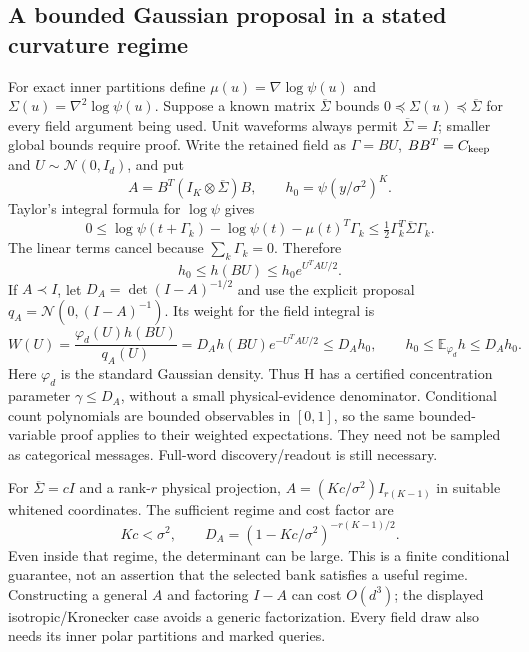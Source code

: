\documentclass[10pt,a4paper]{article}
\newcommand{\E}{\mathbb E}
\begin{document}
\subsection{A bounded Gaussian proposal in a stated curvature regime}
For exact inner partitions define $\mu(u)=\nabla\log\psi(u)$ and
$\Sigma(u)=\nabla^2\log\psi(u)$. Suppose a known matrix $\overline\Sigma$ bounds
$0\preceq\Sigma(u)\preceq\overline\Sigma$ for every field argument being used.
Unit waveforms always permit $\overline\Sigma=I$; smaller global bounds require proof.
Write the retained field as $\Gamma=B U$, $BB^T=C_{\rm keep}$ and $U\sim\mathcal N(0,I_d)$, and put
\[
 A=B^T(I_K\otimes\overline\Sigma)B,\qquad h_0=\psi(y/\sigma^2)^K.
\]
Taylor's integral formula for $\log\psi$ gives
\[
 0\leq\log\psi(t+\Gamma_k)-\log\psi(t)-\mu(t)^T\Gamma_k
       \leq\tfrac12\Gamma_k^T\overline\Sigma\Gamma_k.
\]
The linear terms cancel because $\sum_k\Gamma_k=0$. Therefore
\begin{equation}
 h_0\leq h(BU)\leq h_0e^{U^TAU/2}.
 \label{eq:field-quadratic-envelope}
\end{equation}
If $A\prec I$, let $D_A=\det(I-A)^{-1/2}$ and use the explicit proposal
$q_A=\mathcal N(0,(I-A)^{-1})$. Its weight for the field integral is
\begin{equation}
 W(U)=\frac{\varphi_d(U)h(BU)}{q_A(U)}
     =D_Ah(BU)e^{-U^TAU/2}\leq D_Ah_0,\qquad
 h_0\leq\E_{\varphi_d}h\leq D_Ah_0.
 \label{eq:field-bounded-proposal}
\end{equation}
Here $\varphi_d$ is the standard Gaussian density. Thus H has a certified concentration parameter
$\gamma\leq D_A$, without a small physical-evidence denominator. Conditional count polynomials are bounded
observables in $[0,1]$, so the same bounded-variable proof applies to their weighted expectations.
They need not be sampled as categorical messages. Full-word discovery/readout is still necessary.

For $\overline\Sigma=cI$ and a rank-$r$ physical projection,
$A=(Kc/\sigma^2)I_{r(K-1)}$ in suitable whitened coordinates. The sufficient regime and cost factor are
\[
 Kc<\sigma^2,\qquad D_A=(1-Kc/\sigma^2)^{-r(K-1)/2}.
\]
Even inside that regime, the determinant can be large. This is a finite conditional guarantee, not an
assertion that the selected bank satisfies a useful regime. Constructing a general $A$ and factoring
$I-A$ can cost $O(d^3)$; the displayed isotropic/Kronecker case avoids a generic factorization.
Every field draw also needs its inner polar partitions and marked queries.
\end{document}
